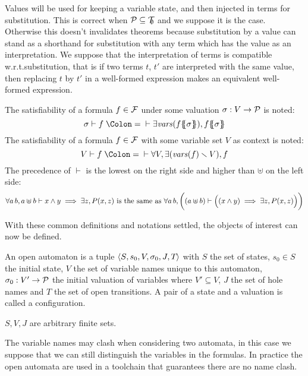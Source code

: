 \documentclass{article}
\begin{document}
Values will be used for keeping a variable state, and then injected in terms for substitution.
This is correct when \(\mathcal{P} \subseteq {\mathcal{T}}_{\!\!\emptyset}\) and we suppose it is the case.
Otherwise this doesn't invalidates theorems because substitution by a value can stand as a shorthand for substitution with any term which has the value as an interpretation.
We suppose that the interpretation of terms is compatible w.r.t.\@ substitution, that is if two terms \(t\), \(t'\) are interpreted with the same value, then replacing \(t\) by \(t'\) in a well-formed expression makes an equivalent well-formed expression.
\begin{noti}
 The satisfiability of a formula \(f \in {\mathcal{F}}\) under some valuation \(\sigma: V \to \mathcal{P}\) is noted:
\[ \sigma \vdash f \defnotation \vdash \exists \fvars{f\psubst{\sigma}}, f\psubst{\sigma} \]
 The satisfiability of a formula \(f \in {\mathcal{F}}\) with some variable set \(V\) as context is noted:
\[ V \vdash f \defnotation \vdash \forall V, \exists\mpar{\fvars{f} \setminus V}, f \]
 The precedence of \(\vdash\) is the lowest on the right side and higher than \(\uplus\) on the left side:
\[ \forall a \, b, a \uplus b \vdash x \wedge y \implies \exists z, P{\left(x,z\right)} \text{ is the same as } \forall a \, b, \bigg((a \uplus b) \vdash \Big((x \wedge y) \implies \exists z, P{\left(x,z\right)}\Big)\bigg) \]
\end{noti}
With these common definitions and notations settled, the objects of interest can now be defined.
\begin{defi}
An open automaton is a tuple \(\left<S_{},s_{0},V_{},\sigma_{0},J_{},T_{}\right>\) with \(S\) the set of states, \(s_0 \in S\) the initial state, \(V\) the set of variable names unique to this automaton, \(\sigma_0: V' \to \mathcal{P}\) the initial valuation of variables where \(V' \subseteq V\), \(J\) the set of hole names and \(T\) the set of open transitions.
A pair of a state and a valuation is called a configuration.

\(S, V, J\) are arbitrary finite sets. %
\end{defi}
The variable names may clash when considering two automata, in this case we suppose that we can still distinguish the variables in the formulas.
In practice the open automata are used in a toolchain that guarantees there are no name clash.
\end{document}
